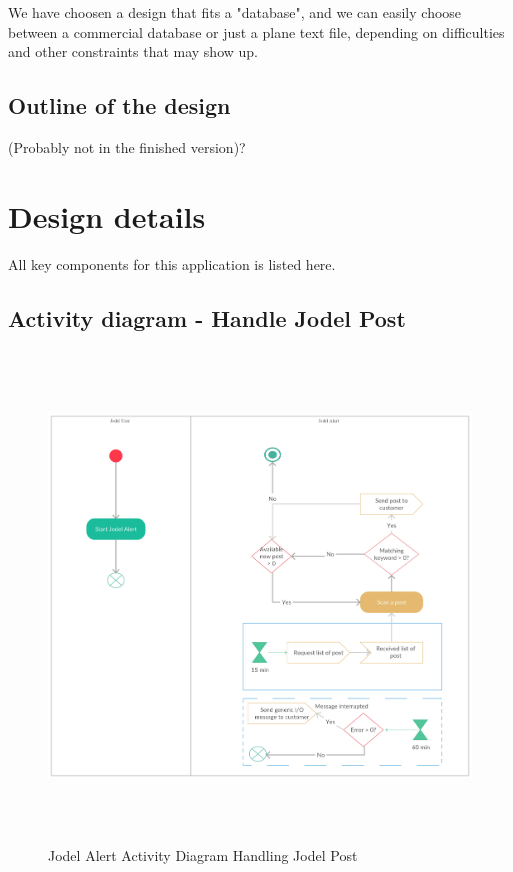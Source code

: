 \documentclass[a4paper,12pt]{article}
\begin{document}
We have choosen a design that fits a "database", and we can easily choose between a commercial database or just a plane text file, depending on difficulties and other constraints that may show up.\\


\subsection{Outline of the design}
(Probably not in the finished version)?
\clearpage
\section{Design details}
All key components for this application is listed here.\\
\subsection{Activity diagram - Handle Jodel Post}
\begin{figure}[!h]
	\centering
	\includegraphics[height=13cm]{img/Activity_diagram-Handling_Jodel_post.pdf}
	\caption{Jodel Alert Activity Diagram Handling Jodel Post}
	\label{Jodel}
\end{figure}
\clearpage
\end{document}
